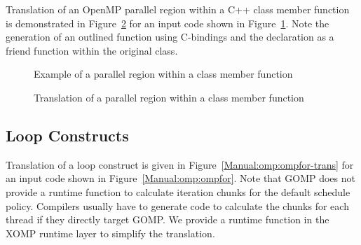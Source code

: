 \clearpage
Translation of an OpenMP parallel region within a C++ class member function is demonstrated in
Figure~\ref{Manual:omp:classMember-trans} for an input code shown in
Figure~\ref{Manual:omp:classMember}. 
Note the generation of an outlined function using C-bindings and the
declaration as a friend function within the original class. 

\lstset{language=C,basicstyle=\scriptsize}
\begin{figure}[htbp]
{\indent
  {\mySmallFontSize
    \begin{latexonly}
    
    \end{latexonly}
    \begin{htmlonly}
    
    \end{htmlonly}
  }
}
\caption{Example of a parallel region within a class member function}
\label{Manual:omp:classMember}
\end{figure}

\begin{figure}[htbp]
{\indent
  {\mySmallFontSize
    \begin{latexonly}
    
    \end{latexonly}
    \begin{htmlonly}
    
    \end{htmlonly}
  }
}
\caption{Translation of a parallel region within a class member function}
\label{Manual:omp:classMember-trans}
\end{figure}


\clearpage
\subsection{Loop Constructs}
Translation of a loop construct is given in
Figure~\ref{Manual:omp:ompfor-trans} for an input code shown in
Figure~\ref{Manual:omp:ompfor}. 
Note that GOMP does not provide a runtime function to calculate iteration chunks for the default schedule policy. 
Compilers usually have to generate code to calculate the chunks for each thread if they directly target GOMP. 
We provide a runtime function in the XOMP runtime layer to simplify the translation. 


